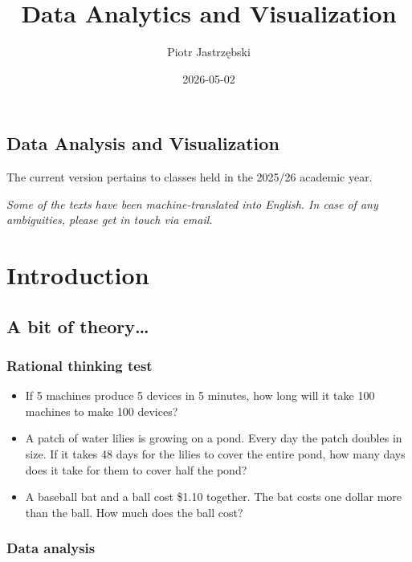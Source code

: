 \documentclass[
  english,
  letterpaper,
  DIV=11,
  numbers=noendperiod]{scrreprt}
\title{Data Analytics and Visualization}
\author{Piotr Jastrzębski}
\date{2026-05-02}
\providecommand{\tightlist}{%
  \setlength{\itemsep}{0pt}\setlength{\parskip}{0pt}}
\renewcommand*\contentsname{Table of contents}
\newcommand\contentsname{Table of contents}
\begin{document}
\maketitle

\renewcommand*\contentsname{Table of contents}
{
\setcounter{tocdepth}{2}
\tableofcontents
}

\chapter{Data Analysis and
Visualization}\label{data-analysis-and-visualization}

The current version pertains to classes held in the 2025/26 academic
year.

\emph{Some of the texts have been machine-translated into English. In
case of any ambiguities, please get in touch via email.}

\part{Introduction}

\chapter{A bit of theory\ldots{}}\label{a-bit-of-theory}

\section{Rational thinking test}\label{rational-thinking-test}

\begin{itemize}
\tightlist
\item
  If 5 machines produce 5 devices in 5 minutes, how long will it take
  100 machines to make 100 devices?
\item
  A patch of water lilies is growing on a pond. Every day the patch
  doubles in size. If it takes 48 days for the lilies to cover the
  entire pond, how many days does it take for them to cover half the
  pond?
\item
  A baseball bat and a ball cost \$1.10 together. The bat costs one
  dollar more than the ball. How much does the ball cost?
\end{itemize}

\section{Data analysis}\label{data-analysis}
\end{document}
